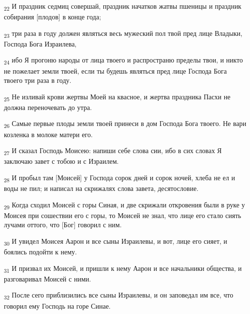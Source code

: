 \begin{tcolorbox}
\textsubscript{22} И праздник седмиц совершай, праздник начатков жатвы пшеницы и праздник собирания [плодов] в конце года;
\end{tcolorbox}
\begin{tcolorbox}
\textsubscript{23} три раза в году должен являться весь мужеский пол твой пред лице Владыки, Господа Бога Израилева,
\end{tcolorbox}
\begin{tcolorbox}
\textsubscript{24} ибо Я прогоню народы от лица твоего и распространю пределы твои, и никто не пожелает земли твоей, если ты будешь являться пред лице Господа Бога твоего три раза в году.
\end{tcolorbox}
\begin{tcolorbox}
\textsubscript{25} Не изливай крови жертвы Моей на квасное, и жертва праздника Пасхи не должна переночевать до утра.
\end{tcolorbox}
\begin{tcolorbox}
\textsubscript{26} Самые первые плоды земли твоей принеси в дом Господа Бога твоего. Не вари козленка в молоке матери его.
\end{tcolorbox}
\begin{tcolorbox}
\textsubscript{27} И сказал Господь Моисею: напиши себе слова сии, ибо в сих словах Я заключаю завет с тобою и с Израилем.
\end{tcolorbox}
\begin{tcolorbox}
\textsubscript{28} И пробыл там [Моисей] у Господа сорок дней и сорок ночей, хлеба не ел и воды не пил; и написал на скрижалях слова завета, десятословие.
\end{tcolorbox}
\begin{tcolorbox}
\textsubscript{29} Когда сходил Моисей с горы Синая, и две скрижали откровения были в руке у Моисея при сошествии его с горы, то Моисей не знал, что лице его стало сиять лучами оттого, что [Бог] говорил с ним.
\end{tcolorbox}
\begin{tcolorbox}
\textsubscript{30} И увидел Моисея Аарон и все сыны Израилевы, и вот, лице его сияет, и боялись подойти к нему.
\end{tcolorbox}
\begin{tcolorbox}
\textsubscript{31} И призвал их Моисей, и пришли к нему Аарон и все начальники общества, и разговаривал Моисей с ними.
\end{tcolorbox}
\begin{tcolorbox}
\textsubscript{32} После сего приблизились все сыны Израилевы, и он заповедал им все, что говорил ему Господь на горе Синае.
\end{tcolorbox}
